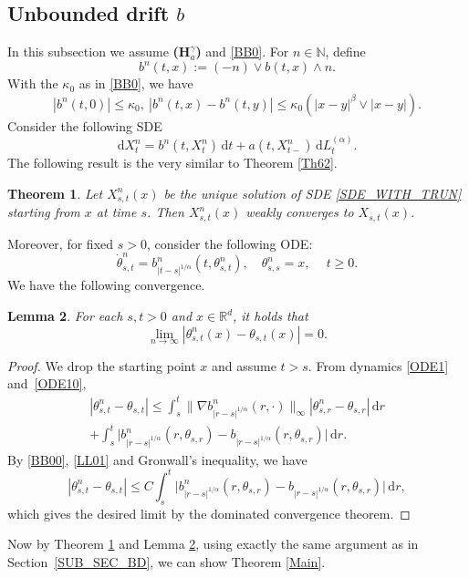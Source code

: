 \documentclass[11pt]{article}
\numberwithin{equation}{section}\providecommand{\asymp}{\mathrel{\sim}}
\newcommand{\rd}{\mathrm{d}}
\theoremstyle{plain}
\newtheorem{theorem}{Theorem}[section]
\newtheorem{lemma}[theorem]{Lemma}
\theoremstyle{definition}
\newcommand\mN{\mathbb{N}}
\newcommand\mR{\mathbb{R}}
\newcommand\1{{\mathbf{1}}}
\newcommand{\dif}{\,\mathrm{d}}
\begin{document}
\subsection{Unbounded drift $b$} \label{SUB_SEC_TRUNC}
In this subsection we assume {\bf (H$^\gamma_a$)} and \eqref{BB0}.
For $n\in\mN$, define
\[
b^n(t,x):=(-n)\vee b(t,x)\wedge n.
\]
With the $\kappa_0$ as in \eqref{BB0}, we have
\begin{equation}\label{BB00}
|b^n(t,0)|\le \kappa_0,\ |b^n(t,x)-b^n(t,y)|\leq\kappa_0(|x-y|^\beta\vee|x-y|).
\end{equation}
Consider the following SDE
\begin{equation}
\rd X_t^n=b^n(t,X_t^n)\dif t+a(t,X_{t-}^n)\dif L^{(\alpha)}_t.
\label{SDE_WITH_TRUN}
\end{equation}
The following result is the very similar to Theorem \ref{Th62}.
\begin{theorem}\label{Th622}
Let $X^n_{s,t}(x)$ be the unique solution of SDE \eqref{SDE_WITH_TRUN} starting from $x$ at time $s$. Then $X^n_{s,t}(x)$ weakly converges to $X_{s,t}(x)$.
\end{theorem}
Moreover, for fixed $s>0$, consider the following ODE:
\begin{equation}\label{ODE10}
\dot\theta^n_{s,t}=b^n_{|t-s|^{1/\alpha}}(t,\theta^n_{s,t}),\quad \theta^n_{s,s}=x,\quad \ t\geq 0.
\end{equation}
We have the following convergence.
\begin{lemma}\label{Le53}
For each $s,t>0$ and $x\in\mR^d$, it holds that
\[
\lim_{n\to\infty}|\theta^n_{s,t}(x)-\theta_{s,t}(x)|=0.
\]
\end{lemma}
\begin{proof}
We drop the starting point $x$ and assume $t\!>\!s$. From dynamics \eqref{ODE1} and~\eqref{ODE10},
\begin{multline*}
|\theta^n_{s,t}-\theta_{s,t}|
\leq\int^t_s\|\nabla b^n_{|r-s|^{1/\alpha}}(r,\cdot)\|_\infty|\theta^n_{s,r}-\theta_{s,r}|\dif r\\
+\int^t_s\big|b^n_{|r-s|^{1/\alpha}}(r,\theta_{s,r})-b_{|r-s|^{1/\alpha}}(r,\theta_{s,r})\big|\dif r.
\end{multline*}
By \eqref{BB00}, \eqref{LL01} and Gronwall's inequality, we have
\[
|\theta^n_{s,t}-\theta_{s,t}|\leq C\int^t_s\big|b^n_{|r-s|^{1/\alpha}}(r,\theta_{s,r})-b_{|r-s|^{1/\alpha}}(r,\theta_{s,r})\big|\dif r,
\]
which gives the desired limit by the dominated convergence theorem.
\end{proof}
Now by Theorem \ref{Th622} and Lemma \ref{Le53}, using exactly the same argument as in Section~\ref{SUB_SEC_BD}, we can show Theorem \ref{Main}.\enlargethispage{-\baselineskip}
\end{document}
